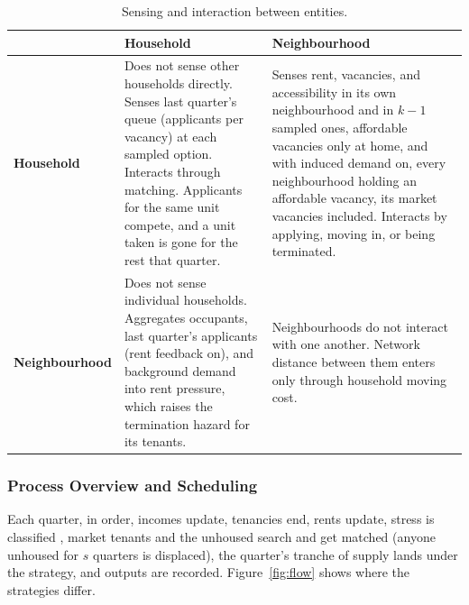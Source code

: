 \documentclass[10pt,a4paper]{article}
\begin{document}
\begin{table}[tp]
\centering
\caption{Sensing and interaction between entities.}
\label{tab:interaction}
\small
\begin{tabular}{L{2.4cm}L{6.1cm}L{6.1cm}}
\toprule
 & \textbf{Household} & \textbf{Neighbourhood} \\
\midrule
\textbf{Household} &
Does not sense other households directly. Senses last quarter's queue (applicants per vacancy) at each sampled option. Interacts through matching. Applicants for the same unit compete, and a unit taken is gone for the rest that quarter. &
Senses rent, vacancies, and accessibility in its own neighbourhood and in $k-1$ sampled ones, affordable vacancies only at home, and with induced demand on, every neighbourhood holding an affordable vacancy, its market vacancies included. Interacts by applying, moving in, or being terminated. \\
\addlinespace
\textbf{Neighbourhood} &
Does not sense individual households. Aggregates occupants, last quarter's applicants (rent feedback on), and background demand into rent pressure, which raises the termination hazard for its tenants. &
Neighbourhoods do not interact with one another. Network distance between them enters only through household moving cost. \\
\bottomrule
\end{tabular}
\end{table}

\subsubsection*{Process Overview and Scheduling}

Each quarter, in order, incomes update, tenancies end, rents update, stress is classified \citep{25}, market tenants and the unhoused search and get matched (anyone unhoused for $s$ quarters is displaced), the quarter's tranche of supply lands under the strategy, and outputs are recorded. Figure~\ref{fig:flow} shows where the strategies differ.
\end{document}
